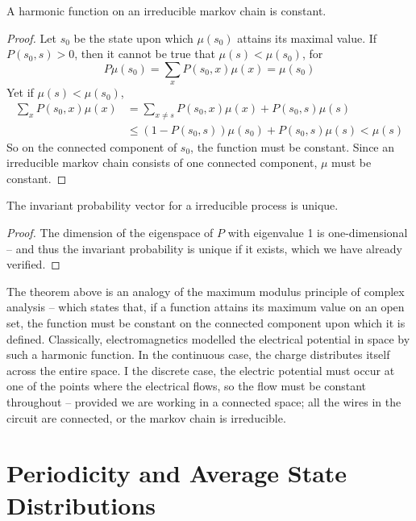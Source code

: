 \begin{lemma}
    A harmonic function on an irreducible markov chain is constant.
\end{lemma}
\begin{proof}
    Let $s_0$ be the state upon which $\mu(s_0)$ attains its maximal value. If $P(s_0, s) > 0$, then it cannot be true that $\mu(s) < \mu(s_0)$, for
    \[ P\mu(s_0) = \sum_x P(s_0,x) \mu(x) = \mu(s_0) \]
    Yet if $\mu(s) < \mu(s_0)$,
    \begin{align*}
        \sum_x P(s_0,x) \mu(x) &= \sum_{x \neq s} P(s_0, x) \mu(x) + P(s_0,s) \mu(s)\\
        &\leq (1 - P(s_0,s)) \mu(s_0) + P(s_0, s) \mu(s) < \mu(s)
    \end{align*}
    So on the connected component of $s_0$, the function must be constant. Since an irreducible markov chain consists of one connected component, $\mu$ must be constant.
\end{proof}

\begin{corollary}
    The invariant probability vector for a irreducible process is unique.
\end{corollary}
\begin{proof}
    The dimension of the eigenspace of $P$ with eigenvalue 1 is one-dimensional -- and thus the invariant probability is unique if it exists, which we have already verified.
\end{proof}

The theorem above is an analogy of the maximum modulus principle of complex analysis -- which states that, if a function attains its maximum value on an open set, the function must be constant on the connected component upon which it is defined. Classically, electromagnetics modelled the electrical potential in space by such a harmonic function. In the continuous case, the charge distributes itself across the entire space. I the discrete case, the electric potential must occur at one of the points where the electrical flows, so the flow must be constant throughout -- provided we are working in a connected space; all the wires in the circuit are connected, or the markov chain is irreducible.

\section{Periodicity and Average State Distributions}

